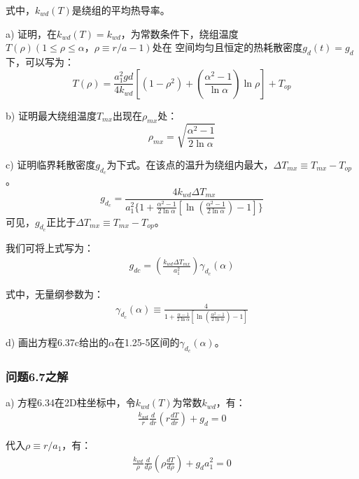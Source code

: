 式中，$k_{wd}(T)$是绕组的平均热导率。

a) 证明，在$k_{wd}(T)=k_{wd}$，为常数条件下，绕组温度$T(\rho)(1\le \rho\le\alpha，\rho\equiv r/a-1)$处在
空间均匀且恒定的热耗散密度$g_d(t)=g_d$下，可以写为：
\begin{equation}%
T(\rho)=\frac{a_1^2gd}{4k_{wd}}\left[(1-\rho^2)+(\frac{\alpha^2-1}{\ln \alpha})\ln\rho\right]+T_{op}
\end{equation}

b) 证明最大绕组温度$T_{mx}$出现在$\rho_{mx}$处：
\begin{equation}%
\rho_{mx}=\sqrt{\frac{\alpha^2-1}{2\ln \alpha}}
\end{equation}

c) 证明临界耗散密度$g_{d_c}$为下式。在该点的温升为绕组内最大，$\Delta T_{mx}\equiv T_{mx}-T_{op}$。
\begin{equation}%
g_{d_c}=\frac{4k_{wd}\Delta T_{mx}}{a_1^2\{1+\frac{\alpha^2-1}{2\ln \alpha}[\ln{(\frac{\alpha^2-1}{2\ln\alpha})}-1]\}}
\end{equation}
可见，$g_{d_c}$正比于$\Delta T_{mx}\equiv T_{mx}-T_{op}$。

我们可将上式写为：
\begin{align*}%
g_{dc}=\left(\frac{k_{wd}\Delta T_{mx}}{a_1^2}\right)\gamma_{d_c}(\alpha) \tag{6.37b}
\end{align*}

式中，无量纲参数为：
\begin{align*}%
\gamma_{d_c}(\alpha)\equiv\frac{4}{1+\frac{\alpha-1}{2\ln\alpha}[\ln(\frac{\alpha^2-1}{2\ln\alpha})-1]} \tag{6.37c}
\end{align*}

d) 画出方程6.37c给出的$\alpha$在1.25-5区间的$\gamma_{d_c}(\alpha)$。


\subsubsection{问题6.7之解}
a) 方程6.34在2D柱坐标中，令$k_{wd}(T)$为常数$k_{wd}$，有：
\begin{align*}%
\frac{k_{wd}}{r} \frac{d}{dr}(r\frac{dT}{dr})+g_d=0 \tag{S7.1a}
\end{align*}

代入$\rho\equiv r/a_1$，有：
\begin{align*}%
\frac{k_{wd}}{\rho}\frac{d}{d\rho}(\rho\frac{dT}{d\rho})+g_da_1^2=0 \tag{S7.1b}
\end{align*}

